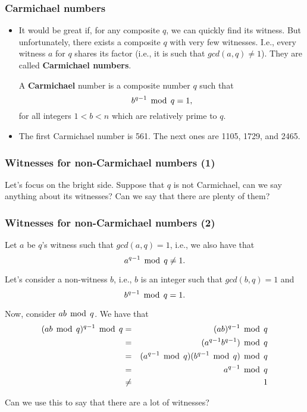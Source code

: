 \begin{frame}\frametitle{Carmichael numbers}
  \begin{itemize}
  \item
    It would be great if, for any composite $q$, we can quickly find
    its witness.  \pause But unfortunately, there exists a composite
    $q$ with very few witnesses. I.e., every witness $a$ for $q$
    shares its factor (i.e., it is such that $gcd(a,q)\neq 1$).
    \pause They are called {\bf Carmichael numbers}.
    \begin{tcolorbox}
      A {\bf Carmichael} number is a composite number $q$ such that
      \[ b^{q-1}\,\bmod\, q = 1, \]
      for all integers $1<b<n$ which are relatively prime to $q$.
    \end{tcolorbox}
    \pause
  \item The first Carmichael number is 561.  The next ones are 1105,
    1729, and 2465.
  \end{itemize}
\end{frame}

\begin{frame}\frametitle{Witnesses for non-Carmichael numbers (1)}
  Let's focus on the bright side.  Suppose that $q$ is not Carmichael,
  can we say anything about its witnesses?  Can we say that there are
  plenty of them?
\end{frame}

\begin{frame}\frametitle{Witnesses for non-Carmichael numbers (2)}
  Let $a$ be $q$'s witness such that $gcd(a,q)=1$, i.e., we also have that
  \[ a^{q-1}\,\bmod\, q\neq 1. \]

  Let's consider a non-witness $b$, i.e., $b$ is an integer such that
  $gcd(b,q)=1$ and \[ b^{q-1}\,\bmod\, q=1. \]

  \pause
  Now, consider $ab\,\bmod\, q$.  \pause We have that
  \begin{eqnarray*}
    (ab\,\bmod\, q)^{q-1}\,\bmod\, q &=& (ab)^{q-1}\,\bmod\, q \\
    &=&(a^{q-1}b^{q-1})\,\bmod\, q \\
    &=& (a^{q-1}\,\bmod\, q)(b^{q-1}\,\bmod\, q)\,\bmod\, q\\
    &=& a^{q-1}\,\bmod\, q\\
    &\neq& 1
  \end{eqnarray*}

  \pause Can we use this to say that there are a lot of witnesses?
\end{frame}

